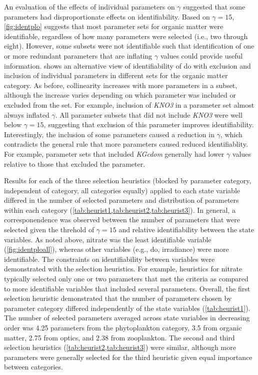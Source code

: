 \documentclass[preprint]{elsarticle}\usepackage[]{graphicx}\usepackage[]{color}
\begin{document}
An evaluation of the effects of individual parameters on $\gamma$ suggested that some parameters had disproportionate effects on identifiability.  Based on $\gamma = 15$, \cref{fig:identplo} suggests that most parameter sets for organic matter were identifiable, regardless of how many parameters were selected (i.e., two through eight).  However, some subsets were not identifiable such that identification of one or more redundant parameters that are inflating $\gamma$ values could provide useful information.   shows an alternative view of identifiability of \ac{do} with exclusion and inclusion of individual parameters in different sets for the organic matter category.  As before, collinearity increases with more parameters in a subset, although the increase varies depending on which parameter was included or excluded from the set.  For example, inclusion of \textit{KNO3} in a parameter set almost always inflated $\gamma$.  All parameter subsets that did not include \textit{KNO3} were well below $\gamma = 15$, suggesting that exclusion of this parameter improves identifiability.  Interestingly, the inclusion of some parameters caused a reduction in $\gamma$, which contradicts the general rule that more parameters caused reduced identifiablity.  For example, parameter sets that included \textit{KGcdom} generally had lower $\gamma$ values relative to those that excluded the parameter.


Results for each of the three selection heuristics (blocked by parameter category, independent of category, all categories equally) applied to each state variable differed in the number of selected parameters and distribution of parameters within each category (\cref{tab:heurist1,tab:heurist2,tab:heurist3}).  In general, a corresponendence was observed between the number of parameters that were selected given the threhold of $\gamma = 15$ and relative identifiability between the state variables.  As noted above, nitrate was the least identifiable variable (\cref{fig:identploall}), whereas other variables (e.g., \ac{do}, irradiance) were more identifiable.  The constraints on identifiability between variables were demonstrated with the selection heuristics.  For example, heuristics for nitrate typically selected only one or two parameters that met the criteria as compared to more identifiable variables that included several parameters. Overall, the first selection heuristic demonstrated that the number of parameters chosen by parameter category differed independently of the state variables (\cref{tab:heurist1}). The number of selected parameters averaged across state variables in decreasing order was 4.25 parameters from the phytoplankton category, 3.5 from organic matter, 2.75 from optics, and 2.38 from zooplankton. The second and third selection heuristics (\cref{tab:heurist2,tab:heurist3}) were similar, although more parameters were generally selected for the third heuristic given equal importance between categories.
\end{document}
